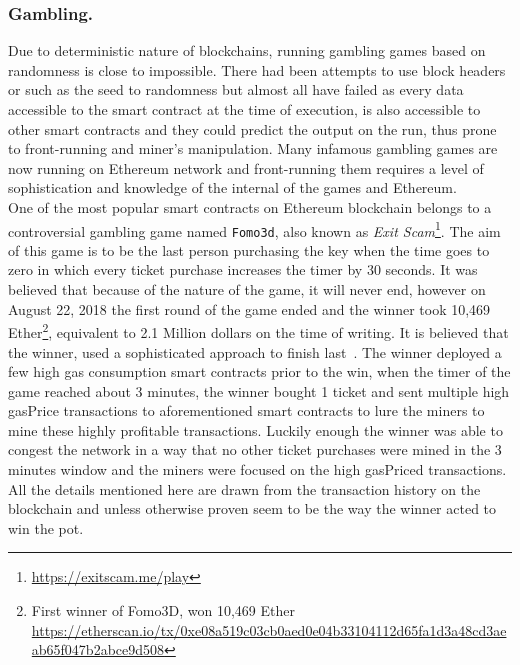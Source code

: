 
\subsubsection{Gambling.} 
Due to deterministic nature of blockchains, running gambling games based on randomness is close to impossible. There had been attempts to use block headers or such as the seed to randomness but almost all have failed as every data accessible to the smart contract at the time of execution, is also accessible to other smart contracts and they could predict the output on the run, thus prone to front-running and miner's manipulation. Many infamous gambling games are now running on Ethereum network and front-running them requires a level of sophistication and knowledge of the internal of the games and Ethereum.\\
One of the most popular smart contracts on Ethereum blockchain belongs to a controversial gambling game named \texttt{Fomo3d}, also known as \textit{Exit Scam}\footnote{\url{https://exitscam.me/play}}. The aim of this game is to be the last person purchasing the key when the time goes to zero in which every ticket purchase increases the timer by 30 seconds. It was believed that because of the nature of the game, it will never end, however on August 22, 2018 the first round of the game ended and the winner took 10,469 Ether\footnote{First winner of Fomo3D, won 10,469 Ether \url{ https://etherscan.io/tx/0xe08a519c03cb0aed0e04b33104112d65fa1d3a48cd3aeab65f047b2abce9d508}}, equivalent to 2.1 Million dollars on the time of writing. 
It is believed that the winner, used a sophisticated approach to finish last~\cite{fomo3dhacker}. The winner deployed a few high gas consumption smart contracts prior to the win, when the timer of the game reached about 3 minutes, the winner bought 1 ticket and sent multiple high gasPrice transactions to aforementioned smart contracts to lure the miners to mine these highly profitable transactions. Luckily enough the winner was able to congest the network in a way that no other ticket purchases were mined in the 3 minutes window and the miners were focused on the high gasPriced transactions. All the details mentioned here are drawn from the transaction history on the blockchain and unless otherwise proven seem to be the way the winner acted to win the pot. 

